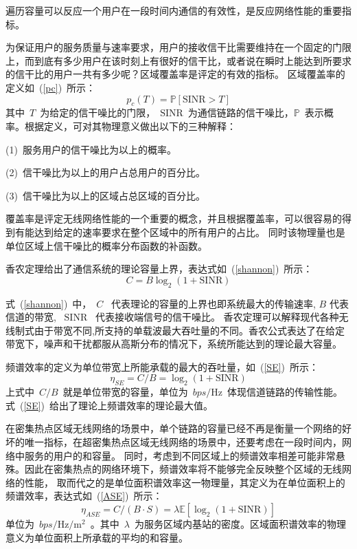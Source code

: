 遍历容量可以反应一个用户在一段时间内通信的有效性，是反应网络性能的重要指标。

为保证用户的服务质量与速率要求，用户的接收信干比需要维持在一个固定的门限上，而到底有多少用户在该时刻上有很好的信干比，或者说在瞬时上能达到所要求的信干比的用户一共有多少呢？区域覆盖率是评定的有效的指标。
区域覆盖率的定义如~(\ref{pc})~所示：
\begin{equation}\label{pc}
  p_c(T) = \mathbb{P}[\mathrm{SINR}>T]
\end{equation}
其中~$T$~为给定的信干噪比的门限，~$\mathrm{SINR}$~为通信链路的信干噪比，$\mathbb{P}$~表示概率。根据定义，可对其物理意义做出以下的三种解释：

 (1)~服务用户的信干噪比为以上的概率。

 (2)~信干噪比为以上的用户占总用户的百分比。

 (3)~信干噪比为以上的区域占总区域的百分比。

覆盖率是评定无线网络性能的一个重要的概念，并且根据覆盖率，可以很容易的得到有能达到给定的速率要求在整个区域中的所有用户的占比。
同时该物理量也是单位区域上信干噪比的概率分布函数的补函数。

香农定理给出了通信系统的理论容量上界，表达式如~(\ref{shannon})~所示：
\begin{equation}\label{shannon}
  C = B \log_2(1+\mathrm{SINR})
\end{equation}

式~(\ref{shannon})~中，~$C$~ 代表理论的容量的上界也即系统最大的传输速率, $B$ 代表信道的带宽, ~$\mathrm{SINR}$~ 代表接收端信号的信干噪比。
香农定理可以解释现代各种无线制式由于带宽不同,所支持的单载波最大吞吐量的不同。香农公式表达了在给定带宽下，噪声和干扰都服从高斯分布的情况下，系统所能达到的理论最大容量。

频谱效率的定义为单位带宽上所能承载的最大的吞吐量，如~(\ref{SE})~所示：
\begin{equation}\label{SE}
\eta_{SE}=C/B=\log_2(1+\mathrm{SINR})
\end{equation}
上式中~$C/B$~就是单位带宽的容量，单位为~$bps/\mathrm{Hz}$~体现信道链路的传输性能。式~(\ref{SE})~给出了理论上频谱效率的理论最大值。

在密集热点区域无线网络的场景中，单个链路的容量已经不再是衡量一个网络的好坏的唯一指标，在超密集热点区域无线网络的场景中，还要考虑在一段时间内，网络中服务的用户的和容量。
同时，考虑到不同区域上的频谱效率相差可能非常悬殊。因此在密集热点的网络环境下，频谱效率将不能够完全反映整个区域的无线网络的性能，
取而代之的是单位面积谱效率这一物理量，其定义为在单位面积上的频谱效率，表达式如~(\ref{ASE})~所示：
\begin{equation}\label{ASE}
  \eta_{ASE}=C/(B\cdot S) = \lambda\mathbb{E}[\log_2(1+\mathrm{SINR})]
\end{equation}
单位为~$bps/\mathrm{Hz}/\mathrm{m}^2$~。其中~$\lambda$~为服务区域内基站的密度。区域面积谱效率的物理意义为单位面积上所承载的平均的和容量。

